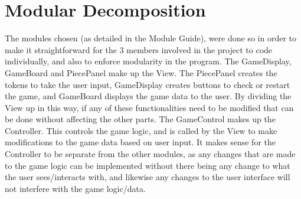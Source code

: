 \documentclass[12pt]{article}
\begin{document}
	\section{Modular Decomposition}
		\begin{figure}[!h]
			\centering
		\end{figure}
	The modules chosen (as detailed in the Module Guide), were done so in order to make it straightforward for the 3 members involved in the project to code individually, and also to enforce modularity in the program. The GameDisplay, GameBoard and PiecePanel make up the View. The PiecePanel creates the tokens to take the user input, GameDisplay creates buttons to check or restart the game, and GameBoard displays the game data to the user. By dividing the View up in this way, if any of these functionalities need to be modified that can be done without affecting the other parts. The GameControl makes up the Controller. This controls the game logic, and is called by the View to make modifications to the game data based on user input. It makes sense for the Controller to be separate from the other modules, as any changes that are made to the game logic can be implemented without there being any change to what the user sees/interacts with, and likewise any changes to the user interface will not interfere with the game logic/data.
	\newpage
\end{document}
